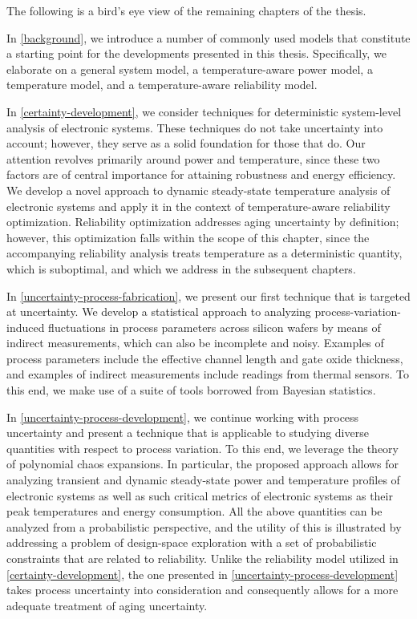 The following is a bird's eye view of the remaining chapters of the thesis.

In \cref{background}, we introduce a number of commonly used models that
constitute a starting point for the developments presented in this thesis.
Specifically, we elaborate on a general system model, a temperature-aware power
model, a temperature model, and a temperature-aware reliability model.

In \cref{certainty-development}, we consider techniques for deterministic
system-level analysis of electronic systems. These techniques do not take
uncertainty into account; however, they serve as a solid foundation for those
that do. Our attention revolves primarily around power and temperature, since
these two factors are of central importance for attaining robustness and energy
efficiency. We develop a novel approach to dynamic steady-state temperature
analysis of electronic systems and apply it in the context of temperature-aware
reliability optimization. Reliability optimization addresses aging uncertainty
by definition; however, this optimization falls within the scope of this
chapter, since the accompanying reliability analysis treats temperature as a
deterministic quantity, which is suboptimal, and which we address in the
subsequent chapters.

In \cref{uncertainty-process-fabrication}, we present our first technique that
is targeted at uncertainty. We develop a statistical approach to analyzing
process-variation-induced fluctuations in process parameters across silicon
wafers by means of indirect measurements, which can also be incomplete and
noisy. Examples of process parameters include the effective channel length and
gate oxide thickness, and examples of indirect measurements include readings
from thermal sensors. To this end, we make use of a suite of tools borrowed from
Bayesian statistics.

In \cref{uncertainty-process-development}, we continue working with process
uncertainty and present a technique that is applicable to studying diverse
quantities with respect to process variation. To this end, we leverage the
theory of polynomial chaos expansions. In particular, the proposed approach
allows for analyzing transient and dynamic steady-state power and temperature
profiles of electronic systems as well as such critical metrics of electronic
systems as their peak temperatures and energy consumption. All the above
quantities can be analyzed from a probabilistic perspective, and the utility of
this is illustrated by addressing a problem of design-space exploration with a
set of probabilistic constraints that are related to reliability. Unlike the
reliability model utilized in \cref{certainty-development}, the one presented in
\cref{uncertainty-process-development} takes process uncertainty into
consideration and consequently allows for a more adequate treatment of aging
uncertainty.


